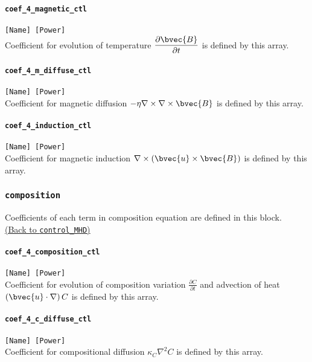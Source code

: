 \paragraph{\tt coef\_4\_magnetic\_ctl}
\label{href_t:coef_4_magnetic_ctl}
\verb|[Name] [Power]| \\
Coefficient for evolution of temperature $\displaystyle \frac{\partial \bvec{B}}{\partial t}$ is defined by this array.

\paragraph{\tt coef\_4\_m\_diffuse\_ctl}
\label{href_t:coef_4_m_diffuse_ctl}
\verb|[Name] [Power]| \\
Coefficient for magnetic diffusion $ -\eta \nabla \times \nabla \times \bvec{B}$ is defined by this array.

\paragraph{\tt coef\_4\_induction\_ctl}
\label{href_t:coef_4_induction_ctl}
\verb|[Name] [Power]| \\
Coefficient for magnetic induction $\nabla \times \left(\bvec{u} \times \bvec{B} \right)$ is defined by this array.

\subsubsection{\tt composition}
\label{href_t:composition}
Coefficients of each term in composition equation are defined in this block. \\
\hyperref[href_i:composition]{(Back to {\tt control\_MHD})}

\paragraph{\tt coef\_4\_composition\_ctl}
\label{href_t:coef_4_composition_ctl}
\verb|[Name] [Power]| \\
Coefficient for evolution of composition variation $\displaystyle \frac{\partial C}{\partial t}$ and advection of heat $\left(\bvec{u} \cdot \nabla \right) C$ is defined by this array.

\paragraph{\tt coef\_4\_c\_diffuse\_ctl}
\label{href_t:coef_4_c_diffuse_ctl}
\verb|[Name] [Power]| \\
Coefficient for compositional diffusion $\displaystyle \kappa_{C} \nabla^{2} C$ is defined by this array.

